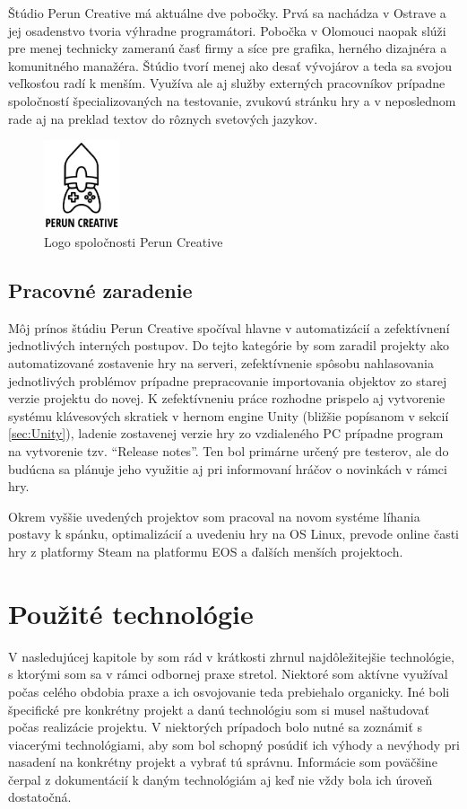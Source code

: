 \documentclass[slovak,bachelorpractice,dept460,male,csharp,cpdeclaration]{diploma}
\begin{document}
Štúdio Perun Creative má aktuálne dve pobočky. Prvá sa nachádza v Ostrave a jej osadenstvo tvoria výhradne programátori. Pobočka v Olomouci naopak slúži pre menej technicky zameranú časť firmy a síce pre grafika, herného dizajnéra a komunitného manažéra. Štúdio tvorí menej ako desať vývojárov a teda sa svojou veľkosťou radí k menším. Využíva ale aj služby externých pracovníkov prípadne spoločností špecializovaných na testovanie, zvukovú stránku hry a v neposlednom rade aj na preklad textov do rôznych svetových jazykov.

\begin{figure}[!htbp]
	\centering
	\includegraphics[width=0.20\textwidth]{Pictures/perunLogo.png}
	\caption{Logo spoločnosti Perun Creative \cite{PerunLinkedIn}}
	\label{pic:perunLogo}
\end{figure}

\subsection{Pracovné zaradenie}
\label{sec:Me}
Môj prínos štúdiu Perun Creative spočíval hlavne v automatizácií a zefektívnení jednotlivých interných postupov. Do tejto kategórie by som zaradil projekty ako automatizované zostavenie hry na serveri, zefektívnenie spôsobu nahlasovania jednotlivých problémov prípadne prepracovanie importovania objektov zo starej verzie projektu do novej. K zefektívneniu práce rozhodne prispelo aj vytvorenie systému klávesových skratiek v hernom engine Unity (bližšie popísanom v sekcií \ref{sec:Unity}), ladenie zostavenej verzie hry zo vzdialeného PC prípadne program na vytvorenie tzv. \enquote{Release notes}. Ten bol primárne určený pre testerov, ale do budúcna sa plánuje jeho využitie aj pri informovaní hráčov o novinkách v rámci hry.

Okrem vyššie uvedených projektov som pracoval na novom systéme líhania postavy k spánku, optimalizácií a uvedeniu hry na OS Linux, prevode online časti hry z platformy Steam na platformu EOS a ďalších menších projektoch.

\section{Použité technológie}
\label{sec:Tech}
V nasledujúcej kapitole by som rád v krátkosti zhrnul najdôležitejšie technológie, s ktorými som sa v rámci odbornej praxe stretol. Niektoré som aktívne využíval počas celého obdobia praxe a ich osvojovanie teda prebiehalo organicky. Iné boli špecifické pre konkrétny projekt a danú technológiu som si musel naštudovať počas realizácie projektu. V niektorých prípadoch bolo nutné sa zoznámiť s viacerými technológiami, aby som bol schopný posúdiť ich výhody a nevýhody pri nasadení na konkrétny projekt a vybrať tú správnu. Informácie som poväčšine čerpal z dokumentácií k daným technológiám aj keď nie vždy bola ich úroveň dostatočná.
\end{document}
